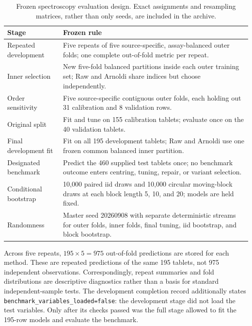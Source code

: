 \begin{table}[htbp]
    \centering
    \small
    \caption[Frozen spectroscopy evaluation design]{Frozen spectroscopy evaluation design.  Exact assignments and
    resampling matrices, rather than only seeds, are included in the archive.}
    \label{tab:app-spectroscopy-validation-design}
    \begin{tabular}{@{}p{3.0cm}p{10.9cm}@{}}
        \toprule
        Stage & Frozen rule \\
        \midrule
        Repeated development
          & Five repeats of five source-specific, assay-balanced outer folds;
            one complete out-of-fold metric per repeat. \\
        Inner selection
          & New five-fold balanced partitions inside each outer training set;
            Raw and Arnoldi share indices but choose independently. \\
        Order sensitivity
          & Five source-specific contiguous outer folds, each holding out 31
            calibration and 8 validation rows. \\
        Original split
          & Fit and tune on 155 calibration tablets; evaluate once on the 40
            validation tablets. \\
        Final development fit
          & Fit on all 195 development tablets; Raw and Arnoldi use one frozen
            common balanced inner partition. \\
        Designated benchmark
          & Predict the 460 supplied test tablets once; no benchmark outcome
            enters centring, tuning, repair, or variant selection. \\
        Conditional bootstrap
          & 10,000 paired iid draws and 10,000 circular moving-block draws at
            each block length 5, 10, and 20; models are held fixed. \\
        Randomness
          & Master seed 20260908 with separate deterministic streams for outer
            folds, inner folds, final tuning, iid bootstrap, and block
            bootstrap. \\
        \bottomrule
    \end{tabular}
\end{table}

Across five repeats, $195\times5=975$ out-of-fold predictions are stored for
each method.  These are repeated predictions of the same 195 tablets, not 975
independent observations.  Correspondingly, repeat summaries and fold
distributions are descriptive diagnostics rather than a basis for standard
independent-sample tests.  The development completion record additionally
states \texttt{benchmark\_variables\_loaded=false}: the development stage did
not load the test variables.  Only after its checks passed was the full stage
allowed to fit the 195-row models and evaluate the benchmark.

